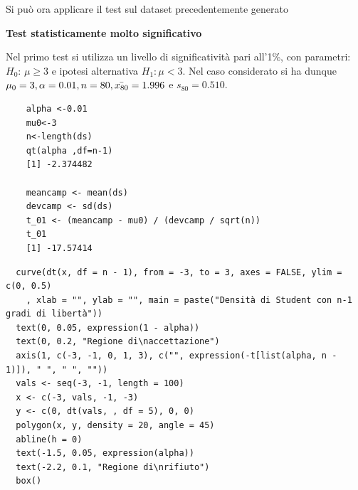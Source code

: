 Si può ora applicare il test sul dataset precedentemente generato

\vspace{5mm}
\noindent \textbf{Test statisticamente molto significativo}

Nel primo test si utilizza un livello di significatività pari all'1\%, con parametri: $H_0$: $\mu \geq 3$ e ipotesi alternativa $H_1: \mu < 3$. Nel caso considerato si ha dunque $\mu_0 = 3, \alpha = 0.01, n = 80, \Bar{x_{80}} = 1.996$ e $s_{80} = 0.510$.

\vspace{5mm}
\begin{lstlisting}
    alpha <-0.01
    mu0<-3
    n<-length(ds)
    qt(alpha ,df=n-1)
    [1] -2.374482

    meancamp <- mean(ds)
    devcamp <- sd(ds)
    t_01 <- (meancamp - mu0) / (devcamp / sqrt(n))
    t_01
    [1] -17.57414
\end{lstlisting}

\vspace{5mm}
\begin{lstlisting}
  curve(dt(x, df = n - 1), from = -3, to = 3, axes = FALSE, ylim = c(0, 0.5)
    , xlab = "", ylab = "", main = paste("Densità di Student con n-1 gradi di libertà"))
  text(0, 0.05, expression(1 - alpha))
  text(0, 0.2, "Regione di\naccettazione")
  axis(1, c(-3, -1, 0, 1, 3), c("", expression(-t[list(alpha, n - 1)]), " ", " ", ""))
  vals <- seq(-3, -1, length = 100)
  x <- c(-3, vals, -1, -3)
  y <- c(0, dt(vals, , df = 5), 0, 0)
  polygon(x, y, density = 20, angle = 45)
  abline(h = 0)
  text(-1.5, 0.05, expression(alpha))
  text(-2.2, 0.1, "Regione di\nrifiuto")
  box()
\end{lstlisting}

